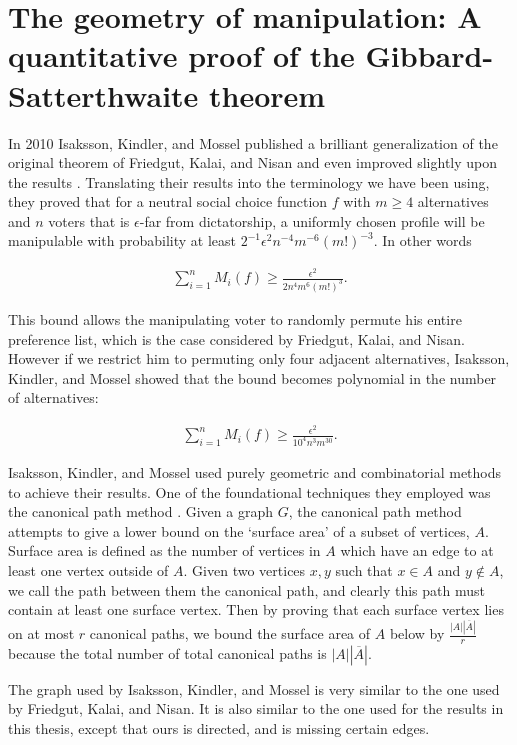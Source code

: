 \section{The geometry of manipulation: A quantitative proof of the Gibbard-Satterthwaite theorem}

	In 2010 Isaksson, Kindler, and Mossel published a brilliant generalization of the original theorem of Friedgut, Kalai, and Nisan and even improved slightly upon the results \cite{isaksson2010geometry}. Translating their results into the terminology we have been using, they proved that for a neutral social choice function $f$ with $m \ge 4$ alternatives and $n$ voters that is $\epsilon$-far from dictatorship, a uniformly chosen profile will be manipulable with probability at least $2^{-1} \epsilon^2 n^{-4} m^{-6} (m!)^{-3}$. In other words

	\begin{align*}
		\sum_{i=1}^n M_i(f) \ge \frac{\epsilon^2}{2 n^4 m^6 (m!)^3}.
	\end{align*}

	This bound allows the manipulating voter to randomly permute his entire preference list, which is the case considered by Friedgut, Kalai, and Nisan. However if we restrict him to permuting only four adjacent alternatives, Isaksson, Kindler, and Mossel showed that the bound becomes polynomial in the number of alternatives:

	\begin{align*}
		\sum_{i=1}^n M_i(f) \ge \frac{\epsilon^2}{10^4 n^3 m^{30}}.
	\end{align*}

	Isaksson, Kindler, and Mossel used purely geometric and combinatorial methods to achieve their results. One of the foundational techniques they employed was the canonical path method \cite{jerrum1993polynomial}. Given a graph $G$, the canonical path method attempts to give a lower bound on the `surface area' of a subset of vertices, $A$. Surface area is defined as the number of vertices in $A$ which have an edge to at least one vertex outside of $A$. Given two vertices $x, y$ such that $x \in A$ and $y \notin A$, we call the path between them the canonical path, and clearly this path must contain at least one surface vertex. Then by proving that each surface vertex lies on at most $r$ canonical paths, we bound the surface area of $A$ below by $\frac{|A| |\overline{A}|}{r}$ because the total number of total canonical paths is $|A| |\overline{A}|$.

	The graph used by Isaksson, Kindler, and Mossel is very similar to the one used by Friedgut, Kalai, and Nisan. It is also similar to the one used for the results in this thesis, except that ours is directed, and is missing certain edges.

